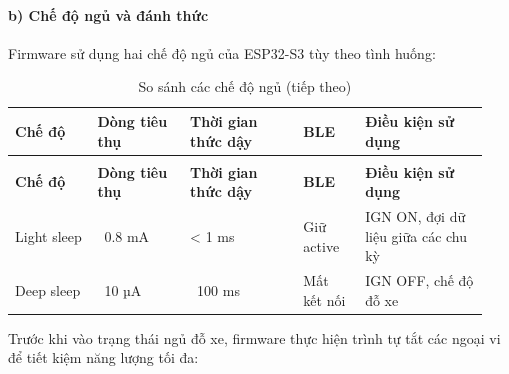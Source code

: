 \documentclass[a4paper]{extarticle}
\newcommand{\thesissettableid}[2]{%
  \renewcommand{\thetable}{#1}%
  \renewcommand{\theHtable}{#2}%
}
\begin{document}
\paragraph{b) Chế độ ngủ và đánh
thức}\label{b-chux1ebf-ux111ux1ed9-ngux1ee7-vuxe0-ux111uxe1nh-thux1ee9c}

Firmware sử dụng hai chế độ ngủ của ESP32-S3 tùy theo tình huống:


{\thesissettableid{4.9}{tab-ch4-so-sanh-cac-che-o-ngu}
\def\LTcaptype{table}
\begin{longtable}{|L{0.162\linewidth}|L{0.181\linewidth}|L{0.225\linewidth}|L{0.128\linewidth}|L{0.249\linewidth}|}
\caption{So sánh các chế độ ngủ}\label{tab:ch4-so-sanh-cac-che-o-ngu}\\
\hline \textbf{Chế độ} & \textbf{Dòng tiêu thụ} & \textbf{Thời gian thức dậy} & \textbf{BLE} & \textbf{Điều kiện sử dụng} \\
\hline
\endfirsthead
\caption[]{So sánh các chế độ ngủ (tiếp theo)}\\
\hline \textbf{Chế độ} & \textbf{Dòng tiêu thụ} & \textbf{Thời gian thức dậy} & \textbf{BLE} & \textbf{Điều kiện sử dụng} \\
\hline
\endhead
\hline
\endfoot
\endlastfoot
Light sleep & ~0.8 mA & \textless{} 1 ms & Giữ active &
IGN ON, đợi dữ liệu giữa các chu kỳ \\\hline
Deep sleep & ~10 µA & ~100 ms & Mất kết nối
& IGN OFF, chế độ đỗ xe \\\hline
\end{longtable}
}


Trước khi vào trạng thái ngủ đỗ xe, firmware thực hiện trình tự tắt các ngoại vi
để tiết kiệm năng lượng tối đa:
\end{document}
